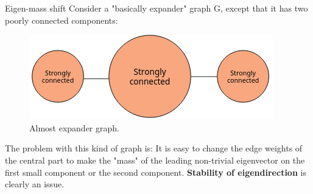 \documentclass[handout]{beamer}
\begin{document}
    \begin{frame}{Eigen-mass shift}
        Consider a "basically expander" graph G, except that it has two poorly connected components:
        \begin{figure}
            \centering
            \includegraphics[scale=0.5]{imgs/ex1_graph_unstable.png}
            \caption{Almost expander graph.}
            \label{fig:ex1_G_unstable}
        \end{figure}
        \pause
        The problem with this kind of graph is: It is easy to change the edge weights of the central part to make the "mass" of the leading non-trivial eigenvector on the first small component or the second component. \pause \textbf{Stability of eigendirection} is clearly an issue. 

    \end{frame}
\end{document}
